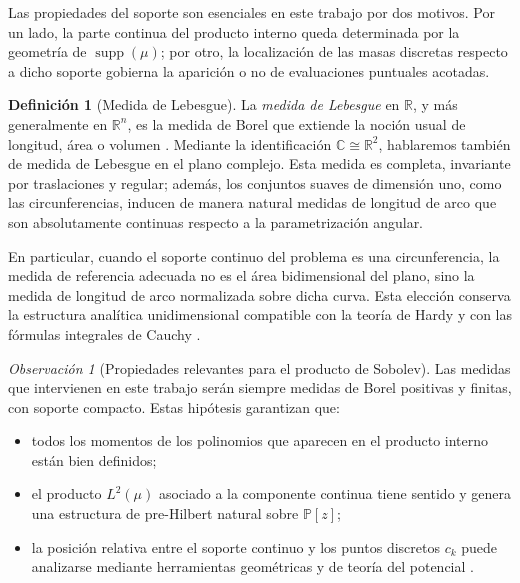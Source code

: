 \documentclass[12pt,a4paper]{article}
\theoremstyle{definition}
\newtheorem{definition}{Definición}
\theoremstyle{remark}
\newtheorem{remark}{Observación}
\newcommand{\Poly}{\mathbb{P}[z]}
\begin{document}
Las propiedades del soporte son esenciales en este trabajo por dos motivos. Por un lado, la parte continua del producto interno queda determinada por la geometría de $\operatorname{supp}(\mu)$; por otro, la localización de las masas discretas respecto a dicho soporte gobierna la aparición o no de evaluaciones puntuales acotadas.

\begin{definition}[Medida de Lebesgue]
	La \emph{medida de Lebesgue} en $\mathbb{R}$, y más generalmente en $\mathbb{R}^n$, es la medida de Borel que extiende la noción usual de longitud, área o volumen \cite{folland1999real,rudin1987real}. Mediante la identificación $\mathbb{C} \cong \mathbb{R}^2$, hablaremos también de medida de Lebesgue en el plano complejo. Esta medida es completa, invariante por traslaciones y regular; además, los conjuntos suaves de dimensión uno, como las circunferencias, inducen de manera natural medidas de longitud de arco que son absolutamente continuas respecto a la parametrización angular.
\end{definition}

En particular, cuando el soporte continuo del problema es una circunferencia, la medida de referencia adecuada no es el área bidimensional del plano, sino la medida de longitud de arco normalizada sobre dicha curva. Esta elección conserva la estructura analítica unidimensional compatible con la teoría de Hardy y con las fórmulas integrales de Cauchy \cite{duren1970theory,szego1975orthogonal}.

\begin{remark}[Propiedades relevantes para el producto de Sobolev]
	Las medidas que intervienen en este trabajo serán siempre medidas de Borel positivas y finitas, con soporte compacto. Estas hipótesis garantizan que:
	\begin{itemize}
		\item todos los momentos de los polinomios que aparecen en el producto interno están bien definidos;
		\item el producto $L^2(\mu)$ asociado a la componente continua tiene sentido y genera una estructura de pre-Hilbert natural sobre $\Poly$;
		\item la posición relativa entre el soporte continuo y los puntos discretos $c_k$ puede analizarse mediante herramientas geométricas y de teoría del potencial \cite{stahl1992general,szego1975orthogonal}.
	\end{itemize}
\end{remark}
\end{document}
